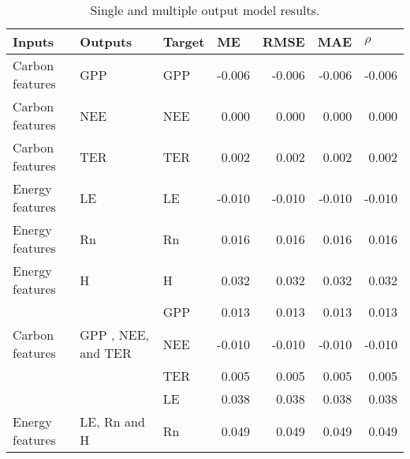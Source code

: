 \begin{table}[htbp]

\caption{Single and multiple output model results.}

\begin{center}

  \begin{tabular}{|l|l|l|r|r|r|r|}

    \hline

    Inputs & Outputs & Target & \multicolumn{1}{l|}{ME} & \multicolumn{1}{l|}{RMSE} & \multicolumn{1}{l|}{MAE} & \multicolumn{1}{l|}{$\rho$} \\ \hline

    Carbon features & GPP & GPP & -0.006 & -0.006 & -0.006 & -0.006 \\ \hline

    Carbon features & NEE  & NEE & 0.000 & 0.000 & 0.000 & 0.000 \\ \hline

    Carbon features & TER  & TER & 0.002 & 0.002 & 0.002 & 0.002 \\ \hline

    Energy features & LE  & LE & -0.010 & -0.010 & -0.010 & -0.010 \\ \hline

    Energy features & Rn  & Rn & 0.016 & 0.016 & 0.016 & 0.016 \\ \hline

    Energy features & H   & H & 0.032 & 0.032 & 0.032 & 0.032 \\ \hline

    \multicolumn{ 1}{|c|}{} & \multicolumn{ 1}{c|}{} & GPP & 0.013 & 0.013 & 0.013 & 0.013 \\ \cline{ 3- 6}

    \multicolumn{ 1}{|l|}{Carbon features} & \multicolumn{ 1}{l|}{GPP , NEE, and TER} & NEE & -0.010 & -0.010 & -0.010 & -0.010 \\ \cline{ 3- 6}

    \multicolumn{ 1}{|l|}{} & \multicolumn{ 1}{l|}{} & TER & 0.005 & 0.005 & 0.005 & 0.005 \\ \hline

    \multicolumn{ 1}{|c|}{} & \multicolumn{ 1}{c|}{} & LE & 0.038 & 0.038 & 0.038 & 0.038 \\ \cline{ 3- 6}

    \multicolumn{ 1}{|l|}{Energy features} & \multicolumn{ 1}{l|}{LE, Rn and H} &  Rn & 0.049 & 0.049 & 0.049 & 0.049 \\ \cline{ 3- 6}


\end{tabular}
\end{center}
\end{table}

